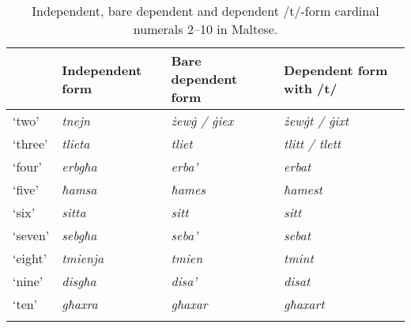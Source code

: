 \documentclass[output=paper]{langsci/langscibook}
\begin{document}
\begin{table}
\begin{tabularx}{\textwidth}{QQQQ} 
\lsptoprule
& \textbf{Independent form} & \textbf{Bare dependent form} & \textbf{Dependent form with /t/}\\
\midrule 
‘two’ & \textit{tnejn} & \textit{żew\.g / \.giex} & \textit{żew\.gt / \.gixt}\\
‘three’ & \textit{tlieta} & \textit{tliet} & \textit{tlitt / tlett}\\
‘four’ & \textit{erbgħa} & \textit{erba’} & \textit{erbat}\\
‘five’ & \textit{ħamsa} & \textit{ħames} & \textit{ħamest}\\
‘six’ & \textit{sitta} & \textit{sitt} & \textit{sitt}\\
‘seven’ & \textit{sebgħa} & \textit{seba’} & \textit{sebat}\\
‘eight’ & \textit{tmienja} & \textit{tmien} & \textit{tmint}\\
‘nine’ & \textit{disgħa} & \textit{disa’ }& \textit{disat}\\
‘ten’ & \textit{għaxra} & \textit{għaxar} & \textit{għaxart}\\
\lspbottomrule
\end{tabularx}
\caption{Independent, bare dependent and dependent /t/-form cardinal numerals 2–10 in Maltese.
}
\label{tab:lucas:1}
\end{table}
\end{document}
